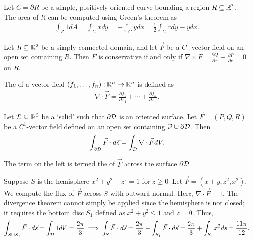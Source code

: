 Let $C = \partial R$ be a simple, positively oriented curve bounding a region $R \subseteq \mathbb{R}^{2}$. The area of $R$ can be computed using Green's theorem as
\begin{align}
    \int_{R} 1 dA = \int_{C} x dy = -\int_{C} y dx = \frac{1}{2} \int_{C} xdy - ydx.
\end{align}


\begin{theorem}
    Let $R \subseteq \mathbb{R}^{2}$ be a simply connected domain, and let $\vec{F}$ be a $C^{1}$-vector field on an open set containing $R$. Then $F$ is conservative if and only if $\nabla \times F = \frac{\partial Q}{\partial x} - \frac{\partial P}{\partial y} = 0$ on $R$.
\end{theorem}

\begin{definition}
    The  of a vector field $(f_{1},\ldots,f_{n}):\mathbb{R}^{n} \to \mathbb{R}^{n}$ is defined as 
    \begin{align}
        \nabla \cdot \vec{F} = \frac{\partial f_{1}}{\partial x_{1}} + \cdots + \frac{\partial f_{n}}{\partial x_{n}}.
    \end{align}
\end{definition}

\begin{theorem}
    Let $\mathcal{D} \subseteq \mathbb{R}^{3}$ be a `solid' such that $\partial \mathcal{D}$ is an oriented surface. Let $\vec{F} = (P,Q,R)$ be a $C^{1}$-vector field defined on an open set containing $\mathcal{D} \cup \partial \mathcal{D}$. Then
    \begin{align}
        \int_{\partial \mathcal{D}} \vec{F} \cdot d\vec{s} = \int_{\mathcal{D}} \nabla \cdot \vec{F} dV.
    \end{align}
\end{theorem}
The term on the left is termed the  of $\vec{F}$ across the surface $\partial \mathcal{D}$.


\begin{example}
    Suppose $S$ is the hemisphere $x^{2}+y^{2}+z^{2} = 1$ for $z \geq 0$. Let $\vec{F} = (x+y,z^{2},x^{2})$. We compute the flux of $\vec{F}$ across $S$ with outward normal. Here, $\nabla \cdot \vec{F} = 1$. The divergence theorem cannot simply be applied since the hemisphere is not closed; it requires the bottom disc $S_{1}$ defined as $x^{2}+y^{2} \leq 1$ and $z = 0$. Thus,
    \begin{align}
        \int_{S \cup S_{1}} \vec{F} \cdot d\vec{s} = \int_{\mathcal{D}} 1 dV = \frac{2\pi}{3} \implies \int_{S} \vec{F} \cdot d\vec{s} = \frac{2\pi}{3} + \int_{S_{1}} \vec{F} \cdot d\vec{s} = \frac{2\pi}{3} + \int_{S_{1}} x^{2} ds = \frac{11\pi}{12}.
    \end{align}
\end{example}


